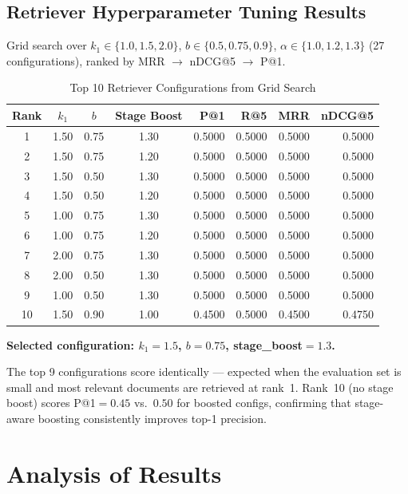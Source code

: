 \documentclass[12pt,a4paper]{article}
\begin{document}
\subsection{Retriever Hyperparameter Tuning Results}

Grid search over $k_1\in\{1.0,1.5,2.0\}$, $b\in\{0.5,0.75,0.9\}$, $\alpha\in\{1.0,1.2,1.3\}$ (27 configurations), ranked by MRR $\to$ nDCG@5 $\to$ P@1.

\begin{table}[h!]
\centering
\caption{Top 10 Retriever Configurations from Grid Search}
\begin{tabular}{ccccrrrr}
\toprule
Rank & $k_1$ & $b$ & Stage Boost & P@1 & R@5 & MRR & nDCG@5 \\
\midrule
1  & 1.50 & 0.75 & 1.30 & 0.5000 & 0.5000 & 0.5000 & 0.5000 \\
2  & 1.50 & 0.75 & 1.20 & 0.5000 & 0.5000 & 0.5000 & 0.5000 \\
3  & 1.50 & 0.50 & 1.30 & 0.5000 & 0.5000 & 0.5000 & 0.5000 \\
4  & 1.50 & 0.50 & 1.20 & 0.5000 & 0.5000 & 0.5000 & 0.5000 \\
5  & 1.00 & 0.75 & 1.30 & 0.5000 & 0.5000 & 0.5000 & 0.5000 \\
6  & 1.00 & 0.75 & 1.20 & 0.5000 & 0.5000 & 0.5000 & 0.5000 \\
7  & 2.00 & 0.75 & 1.30 & 0.5000 & 0.5000 & 0.5000 & 0.5000 \\
8  & 2.00 & 0.50 & 1.30 & 0.5000 & 0.5000 & 0.5000 & 0.5000 \\
9  & 1.00 & 0.50 & 1.30 & 0.5000 & 0.5000 & 0.5000 & 0.5000 \\
10 & 1.50 & 0.90 & 1.00 & 0.4500 & 0.5000 & 0.4500 & 0.4750 \\
\bottomrule
\end{tabular}
\end{table}

\textbf{Selected configuration: $k_1=1.5$, $b=0.75$, stage\_boost$=1.3$.}

The top 9 configurations score identically --- expected when the evaluation set is small and most relevant documents are retrieved at rank~1. Rank~10 (no stage boost) scores P@1$=0.45$ vs.\ $0.50$ for boosted configs, confirming that stage-aware boosting consistently improves top-1 precision.

\section{Analysis of Results}
\end{document}
